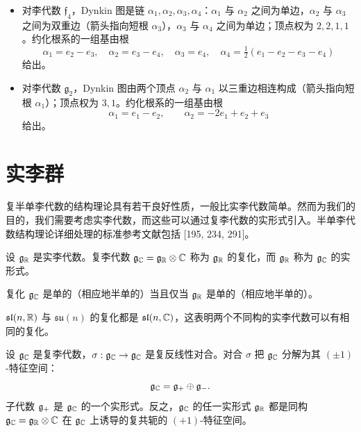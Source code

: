 \begin{theorem}[A.16]
\begin{itemize}
\[
\alpha_1=\tfrac12(e_1+e_8)-\tfrac12(e_2+e_3+e_4+e_5+e_6+e_7),\quad \alpha_2=e_1+e_2,\quad \alpha_3=e_2-e_1,
\]
\[
\alpha_4=e_3-e_2,\quad \alpha_5=e_4-e_3,\quad \alpha_6=e_5-e_4,\quad \alpha_7=e_6-e_5,\quad \alpha_8=e_7-e_6
\]
给出。
\item 对李代数 $\mathfrak{f}_4$，Dynkin 图是链 $\alpha_1,\alpha_2,\alpha_3,\alpha_4$：$\alpha_1$ 与 $\alpha_2$ 之间为单边，$\alpha_2$ 与 $\alpha_3$ 之间为双重边（箭头指向短根 $\alpha_3$），$\alpha_3$ 与 $\alpha_4$ 之间为单边；顶点权为 $2,2,1,1$。约化根系的一组基由根
\[
\alpha_1=e_2-e_3,\quad \alpha_2=e_3-e_4,\quad \alpha_3=e_4,\quad \alpha_4=\tfrac12(e_1-e_2-e_3-e_4)
\]
给出。
\item 对李代数 $\mathfrak{g}_2$，Dynkin 图由两个顶点 $\alpha_2$ 与 $\alpha_1$ 以三重边相连构成（箭头指向短根 $\alpha_1$）；顶点权为 $3,1$。约化根系的一组基由根
\[
\alpha_1=e_1-e_2,\qquad \alpha_2=-2e_1+e_2+e_3
\]
给出。
\end{itemize}
\end{theorem}


\section{实李群}

复半单李代数的结构理论具有若干良好性质，一般比实李代数简单。然而为我们的目的，我们需要考虑实李代数，而这些可以通过复李代数的实形式引入。半单李代数结构理论详细处理的标准参考文献包括 [195, 234, 291]。

\begin{definition}[A.17] 设 $\mathfrak{g}_{\mathbb{R}}$ 是实李代数。复李代数 $\mathfrak{g}_{\mathbb{C}}=\mathfrak{g}_{\mathbb{R}}\otimes\mathbb{C}$ 称为 $\mathfrak{g}_{\mathbb{R}}$ 的复化，而 $\mathfrak{g}_{\mathbb{R}}$ 称为 $\mathfrak{g}_{\mathbb{C}}$ 的实形式。
\end{definition}

\begin{remark}[A.18] 复化 $\mathfrak{g}_{\mathbb{C}}$ 是单的（相应地半单的）当且仅当 $\mathfrak{g}_{\mathbb{R}}$ 是单的（相应地半单的）。
\end{remark}

\begin{example}[A.19] $\mathfrak{sl}(n,\mathbb{R})$ 与 $\mathfrak{su}(n)$ 的复化都是 $\mathfrak{sl}(n,\mathbb{C})$，这表明两个不同构的实李代数可以有相同的复化。
\end{example}

\begin{proposition}[A.20] 设 $\mathfrak{g}_{\mathbb{C}}$ 是复李代数，$\sigma:\mathfrak{g}_{\mathbb{C}}\to\mathfrak{g}_{\mathbb{C}}$ 是复反线性对合。对合 $\sigma$ 把 $\mathfrak{g}_{\mathbb{C}}$ 分解为其 $(\pm1)$-特征空间：
\[
\mathfrak{g}_{\mathbb{C}}=\mathfrak{g}_+\oplus\mathfrak{g}_-.
\]
子代数 $\mathfrak{g}_+$ 是 $\mathfrak{g}_{\mathbb{C}}$ 的一个实形式。反之，$\mathfrak{g}_{\mathbb{C}}$ 的任一实形式 $\mathfrak{g}_{\mathbb{R}}$ 都是同构 $\mathfrak{g}_{\mathbb{C}}=\mathfrak{g}_{\mathbb{R}}\otimes\mathbb{C}$ 在 $\mathfrak{g}_{\mathbb{C}}$ 上诱导的复共轭的 $(+1)$-特征空间。
\end{proposition}


